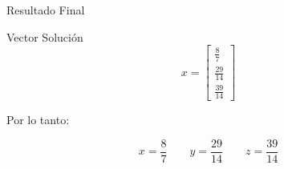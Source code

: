 \documentclass[10pt, aspectratio=169]{beamer}
\begin{document}
	\begin{frame}{Resultado Final}
		\centering
		
		\begin{block}{Vector Solución}
			\[
			x=
			\begin{bmatrix}
				\frac{8}{7}\\
				\frac{29}{14}\\
				\frac{39}{14}
			\end{bmatrix}
			\]
		\end{block}
		
		\vspace{0.5cm}
		
		Por lo tanto:
		
		\[
		\boxed{x=\frac{8}{7}}
		\qquad
		\boxed{y=\frac{29}{14}}
		\qquad
		\boxed{z=\frac{39}{14}}
		\]
	\end{frame}
	
\end{document}
